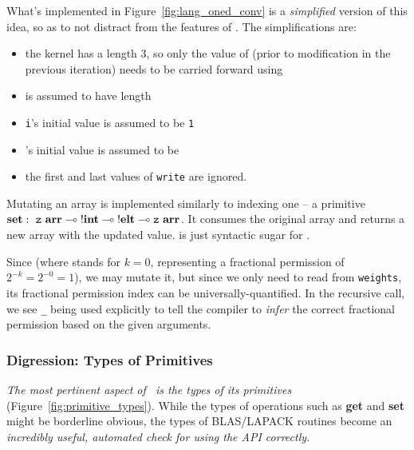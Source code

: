 What's implemented in Figure~\ref{fig:lang_oned_conv} is a \emph{simplified}
version of this idea, so as to not distract from the features of \lang. The
simplifications are:
\begin{itemize}
    \item the kernel has a length 3, so only the value of 
        (prior to modification in the previous iteration) needs to be carried
        forward using 
    \item {} is assumed to have length 
    \item \texttt{i}'s initial value is assumed to be \texttt{1}
    \item {}'s initial value is assumed to be 
    \item the first and last values of \texttt{write} are ignored.
\end{itemize}

Mutating an array is implemented similarly to indexing one -- a primitive
$\mathbf{set}:\ {\texttt{z}\ \mathbf{arr}} \multimap {!\mathbf{int}} \multimap {!\mathbf{elt}} \multimap
{\texttt{z}\ \mathbf{arr}}$. It consumes the original array and returns a new array with
the updated value.   is just syntactic
sugar for .

Since  (where \Zf stands for $k=0$, representing a
fractional permission of $2^{-k} = 2^{-0} = 1$), we may mutate it, but since we
only need to read from \texttt{weights}, its fractional permission index can be
universally-quantified. In the recursive call, we see \texttt{\_} being used
explicitly to tell the compiler to \emph{infer} the correct fractional
permission based on the given arguments.

\subsubsection{Digression: Types of Primitives}

\emph{The most pertinent aspect of \lang\ is the types of its primitives}
(Figure~\ref{fig:primitive_types}).  While the types of operations such as
\textbf{get} and \textbf{set} might be borderline obvious, the types of
BLAS/LAPACK routines become an \emph{incredibly useful, automated check for
using the API correctly.}

